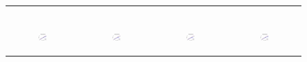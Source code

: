 \begin{figure}[ht]
\begin{tabular}{cccc}
\begin{subfigure}[b]{0.22\textwidth}
			\caption{}
			\label{appfig:partition:runtime_it2004_maxgraphcut}
	  \end{subfigure} \\
	  \begin{subfigure}[b]{0.22\textwidth}
	  	\includegraphics[width=110pt]{images_partition/speedup_friendster_maxgraphcut.eps}
			\caption{}
			\label{appfig:partition:speedup_friendster_maxgraphcut}
	  \end{subfigure} &
	  \begin{subfigure}[b]{0.22\textwidth}
	  	\includegraphics[width=110pt]{images_partition/speedup_arabic2005_maxgraphcut.eps}
			\caption{}
			\label{appfig:partition:speedup_arabic2005_maxgraphcut}
	  \end{subfigure} &
	  \begin{subfigure}[b]{0.22\textwidth}
	  	\includegraphics[width=110pt]{images_partition/speedup_uk2005_maxgraphcut.eps}
			\caption{}
			\label{appfig:partition:speedup_uk2005_maxgraphcut}
	  \end{subfigure} &
	  \begin{subfigure}[b]{0.22\textwidth}
	  	\includegraphics[width=110pt]{images_partition/speedup_it2004_maxgraphcut.eps}

\end{subfigure}
\end{tabular}
\end{figure}
